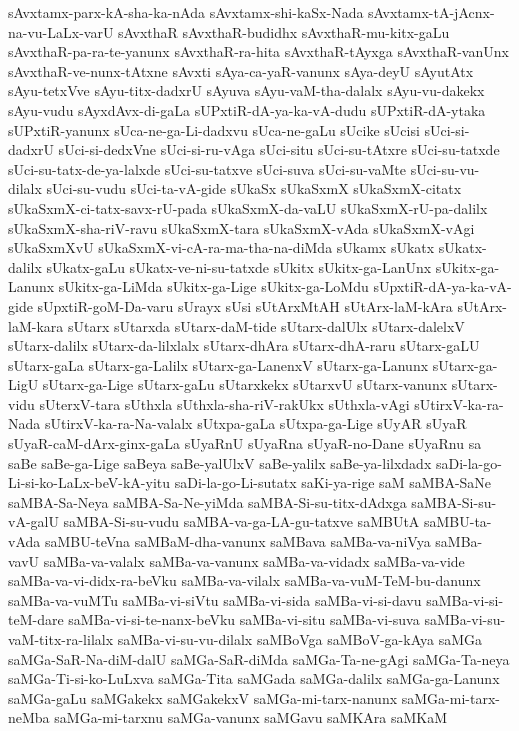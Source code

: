 {sAvxtamx-parx-kA-sha-ka-nAda
sAvxtamx-shi-kaSx-Nada
sAvxtamx-tA-jAcnx-na-vu-LaLx-varU
sAvxthaR
sAvxthaR-budidhx
sAvxthaR-mu-kitx-gaLu
sAvxthaR-pa-ra-te-yanunx
sAvxthaR-ra-hita
sAvxthaR-tAyxga
sAvxthaR-vanUnx
sAvxthaR-ve-nunx-tAtxne
sAvxti
sAya-ca-yaR-vanunx
sAya-deyU
sAyutAtx
sAyu-tetxVve
sAyu-titx-dadxrU
sAyuva
sAyu-vaM-tha-dalalx
sAyu-vu-dakekx
sAyu-vudu
sAyxdAvx-di-gaLa
sUPxtiR-dA-ya-ka-vA-dudu
sUPxtiR-dA-ytaka
sUPxtiR-yanunx
sUca-ne-ga-Li-dadxvu
sUca-ne-gaLu
sUcike
sUcisi
sUci-si-dadxrU
sUci-si-dedxVne
sUci-si-ru-vAga
sUci-situ
sUci-su-tAtxre
sUci-su-tatxde
sUci-su-tatx-de-ya-lalxde
sUci-su-tatxve
sUci-suva
sUci-su-vaMte
sUci-su-vu-dilalx
sUci-su-vudu
sUci-ta-vA-gide
sUkaSx
sUkaSxmX
sUkaSxmX-citatx
sUkaSxmX-ci-tatx-savx-rU-pada
sUkaSxmX-da-vaLU
sUkaSxmX-rU-pa-dalilx
sUkaSxmX-sha-riV-ravu
sUkaSxmX-tara
sUkaSxmX-vAda
sUkaSxmX-vAgi
sUkaSxmXvU
sUkaSxmX-vi-cA-ra-ma-tha-na-diMda
sUkamx
sUkatx
sUkatx-dalilx
sUkatx-gaLu
sUkatx-ve-ni-su-tatxde
sUkitx
sUkitx-ga-LanUnx
sUkitx-ga-Lanunx
sUkitx-ga-LiMda
sUkitx-ga-Lige
sUkitx-ga-LoMdu
sUpxtiR-dA-ya-ka-vA-gide
sUpxtiR-goM-Da-varu
sUrayx
sUsi
sUtArxMtAH
sUtArx-laM-kAra
sUtArx-laM-kara
sUtarx
sUtarxda
sUtarx-daM-tide
sUtarx-dalUlx
sUtarx-dalelxV
sUtarx-dalilx
sUtarx-da-lilxlalx
sUtarx-dhAra
sUtarx-dhA-raru
sUtarx-gaLU
sUtarx-gaLa
sUtarx-ga-Lalilx
sUtarx-ga-LanenxV
sUtarx-ga-Lanunx
sUtarx-ga-LigU
sUtarx-ga-Lige
sUtarx-gaLu
sUtarxkekx
sUtarxvU
sUtarx-vanunx
sUtarx-vidu
sUterxV-tara
sUthxla
sUthxla-sha-riV-rakUkx
sUthxla-vAgi
sUtirxV-ka-ra-Nada
sUtirxV-ka-ra-Na-valalx
sUtxpa-gaLa
sUtxpa-ga-Lige
sUyAR
sUyaR
sUyaR-caM-dArx-ginx-gaLa
sUyaRnU
sUyaRna
sUyaR-no-Dane
sUyaRnu
sa
saBe
saBe-ga-Lige
saBeya
saBe-yalUlxV
saBe-yalilx
saBe-ya-lilxdadx
saDi-la-go-Li-si-ko-LaLx-beV-kA-yitu
saDi-la-go-Li-sutatx
saKi-ya-rige
saM
saMBA-SaNe
saMBA-Sa-Neya
saMBA-Sa-Ne-yiMda
saMBA-Si-su-titx-dAdxga
saMBA-Si-su-vA-galU
saMBA-Si-su-vudu
saMBA-va-ga-LA-gu-tatxve
saMBUtA
saMBU-ta-vAda
saMBU-teVna
saMBaM-dha-vanunx
saMBava
saMBa-va-niVya
saMBa-vavU
saMBa-va-valalx
saMBa-va-vanunx
saMBa-va-vidadx
saMBa-va-vide
saMBa-va-vi-didx-ra-beVku
saMBa-va-vilalx
saMBa-va-vuM-TeM-bu-danunx
saMBa-va-vuMTu
saMBa-vi-siVtu
saMBa-vi-sida
saMBa-vi-si-davu
saMBa-vi-si-teM-dare
saMBa-vi-si-te-nanx-beVku
saMBa-vi-situ
saMBa-vi-suva
saMBa-vi-su-vaM-titx-ra-lilalx
saMBa-vi-su-vu-dilalx
saMBoVga
saMBoV-ga-kAya
saMGa
saMGa-SaR-Na-diM-dalU
saMGa-SaR-diMda
saMGa-Ta-ne-gAgi
saMGa-Ta-neya
saMGa-Ti-si-ko-LuLxva
saMGa-Tita
saMGada
saMGa-dalilx
saMGa-ga-Lanunx
saMGa-gaLu
saMGakekx
saMGakekxV
saMGa-mi-tarx-nanunx
saMGa-mi-tarx-neMba
saMGa-mi-tarxnu
saMGa-vanunx
saMGavu
saMKAra
saMKaM
}

